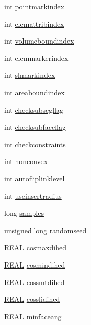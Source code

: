 \begin{DoxyCompactItemize}
int \hyperlink{classtetgenmesh_a0da665af737fd8d5db7b7e8d6f97d325}{pointmarkindex}
\item 
int \hyperlink{classtetgenmesh_a52dfc8427820c4f4d2c3209b05897b3f}{elemattribindex}
\item 
int \hyperlink{classtetgenmesh_afbc49fd2c3c19c8725ea89348440e58b}{volumeboundindex}
\item 
int \hyperlink{classtetgenmesh_a7aa641823e09c9762b497ed098133e70}{elemmarkerindex}
\item 
int \hyperlink{classtetgenmesh_a95a36881e979fdd33fce53dfe621dd27}{shmarkindex}
\item 
int \hyperlink{classtetgenmesh_abf62aababba80f7b7f19fa28151573d4}{areaboundindex}
\item 
int \hyperlink{classtetgenmesh_a3526f3e3bbe8d630feb0815f1918385a}{checksubsegflag}
\item 
int \hyperlink{classtetgenmesh_acb8eb61f03880557af465a726797c2df}{checksubfaceflag}
\item 
int \hyperlink{classtetgenmesh_a96fba71b8476fa4423702eeb94631383}{checkconstraints}
\item 
int \hyperlink{classtetgenmesh_ab92b76b15a48ed42db8db49dc2b3a651}{nonconvex}
\item 
int \hyperlink{classtetgenmesh_a18729c9c93774bdb0397f9181ddc9609}{autofliplinklevel}
\item 
int \hyperlink{classtetgenmesh_a45386c7a807521fadc994a0be99df405}{useinsertradius}
\item 
long \hyperlink{classtetgenmesh_a0f1e1bd695df6ce04f21329a585e1b84}{samples}
\item 
unsigned long \hyperlink{classtetgenmesh_a7a81e8968d62ee9b09fb4b3df9acddd5}{randomseed}
\item 
\hyperlink{tetgen_8h_a4b654506f18b8bfd61ad2a29a7e38c25}{R\+E\+AL} \hyperlink{classtetgenmesh_a9f7eadf1045c2b4c1c97438077609e8f}{cosmaxdihed}
\item 
\hyperlink{tetgen_8h_a4b654506f18b8bfd61ad2a29a7e38c25}{R\+E\+AL} \hyperlink{classtetgenmesh_a0e58e1614215c6ec5886fb85692a9f04}{cosmindihed}
\item 
\hyperlink{tetgen_8h_a4b654506f18b8bfd61ad2a29a7e38c25}{R\+E\+AL} \hyperlink{classtetgenmesh_ad551e8a0e3089c279a782a721e031346}{cossmtdihed}
\item 
\hyperlink{tetgen_8h_a4b654506f18b8bfd61ad2a29a7e38c25}{R\+E\+AL} \hyperlink{classtetgenmesh_a5dbb7eb25c4da3be88fe6d643bcc0e84}{cosslidihed}
\item 
\hyperlink{tetgen_8h_a4b654506f18b8bfd61ad2a29a7e38c25}{R\+E\+AL} \hyperlink{classtetgenmesh_a6baefb6eda35b7b77f6b065425ee8247}{minfaceang}

\end{DoxyCompactItemize}
